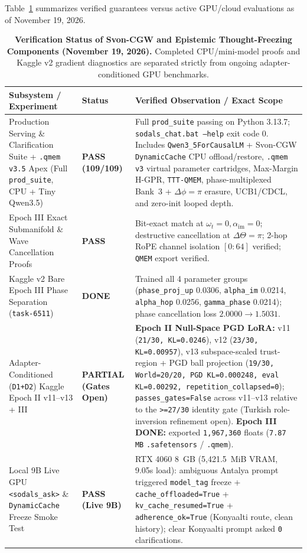 \documentclass[11pt,a4paper]{article}
\begin{document}
Table~\ref{tab:paper4_status} summarizes verified guarantees versus active GPU/cloud evaluations as of November 19, 2026.

\begin{table}[t]
\centering
\caption{\textbf{Verification Status of Svon-CGW and Epistemic Thought-Freezing Components (November 19, 2026).} Completed CPU/mini-model proofs and Kaggle v2 gradient diagnostics are separated strictly from ongoing adapter-conditioned GPU benchmarks.}
\label{tab:paper4_status}
\small
\begin{tabular}{@{}p{4.8cm}p{2.2cm}p{7.4cm}@{}}
\toprule
\textbf{Subsystem / Experiment} & \textbf{Status} & \textbf{Verified Observation / Exact Scope} \\
\midrule
Production Serving \& Clarification Suite + \texttt{.qmem v3.5} Apex (Full \texttt{prod\_suite}, CPU + Tiny Qwen3.5) & \textbf{PASS (109/109)} & Full \texttt{prod\_suite} passing on Python 3.13.7; \texttt{sodals\_chat.bat --help} exit code 0. Includes \texttt{Qwen3\_5ForCausalLM} + Svon-CGW \texttt{DynamicCache} CPU offload/restore, \texttt{.qmem v3} virtual parameter cartridges, Max-Margin H-GPR, \texttt{TTT-QMEM}, phase-multiplexed Bank~3 + $\Delta\phi=\pi$ erasure, UCB1/CDCL, and zero-init looped depth. \\
Epoch III Exact Submanifold \& Wave Cancellation Proofs & \textbf{PASS} & Bit-exact match at $\omega_t=0, \alpha_{\text{im}}=0$; destructive cancellation at $\Delta\Theta=\pi$; 2-hop RoPE channel isolation $[0:64]$ verified; \texttt{QMEM} export verified. \\
Kaggle v2 Bare Epoch III Phase Separation (\texttt{task-6511}) & \textbf{DONE} & Trained all 4 parameter groups (\texttt{phase\_proj\_up} 0.0306, \texttt{alpha\_im} 0.0214, \texttt{alpha\_hop} 0.0256, \texttt{gamma\_phase} 0.0214); phase cancellation loss $2.0000 \to 1.5031$. \\
\midrule
Adapter-Conditioned (\texttt{D1+D2}) Kaggle Epoch II v11--v13 + III & \textbf{PARTIAL (Gates Open)} & \textbf{Epoch II Null-Space PGD LoRA:} v11 (\texttt{21/30, KL=0.0246}), v12 (\texttt{23/30, KL=0.00957}), v13 subspace-scaled trust-region + PGD ball projection (\texttt{19/30, World=20/20, PGD KL=0.000248, eval KL=0.00292, repetition\_collapsed=0}); \texttt{passes\_gates=False} across v11--v13 relative to the \texttt{>=27/30} identity gate (Turkish role-inversion refinement open). \textbf{Epoch III DONE:} exported \texttt{1,967,360} floats (\texttt{7.87 MB} \texttt{.safetensors} / \texttt{.qmem}). \\
Local 9B Live GPU \texttt{<sodals\_ask>} \& \texttt{DynamicCache} Freeze Smoke Test & \textbf{PASS (Live 9B)} & RTX 4060 8~GB (5,421.5~MiB VRAM, 9.05s load): ambiguous Antalya prompt triggered \texttt{model\_tag} freeze + \texttt{cache\_offloaded=True} + \texttt{kv\_cache\_resumed=True} + \texttt{adherence\_ok=True} (Konyaalti route, clean history); clear Konyaalti prompt asked \texttt{0} clarifications. \\

\end{tabular}
\end{table}
\end{document}
